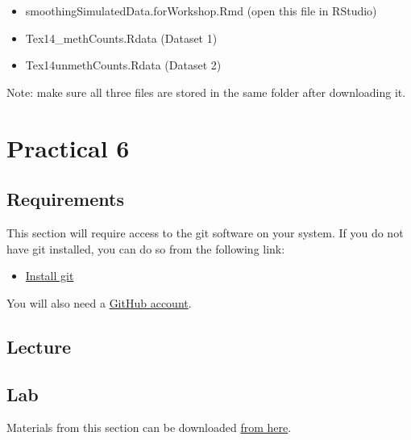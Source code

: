 \documentclass[
]{book}
\providecommand{\tightlist}{%
  \setlength{\itemsep}{0pt}\setlength{\parskip}{0pt}}
\begin{document}
\begin{itemize}
\item
  smoothingSimulatedData.forWorkshop.Rmd (open this file in RStudio)
\item
  Tex14\_methCounts.Rdata (Dataset 1)
\item
  Tex14unmethCounts.Rdata (Dataset 2)
\end{itemize}

Note: make sure all three files are stored in the same folder after downloading it.

\chapter{Practical 6}\label{practical-6}

\section{Requirements}\label{requirements-3}

This section will require access to the git software on your system. If you do not have git installed, you can do so from the following link:

\begin{itemize}
\tightlist
\item
  \href{https://git-scm.com/book/en/v2/Getting-Started-Installing-Git}{Install git}
\end{itemize}

You will also need a \href{http://github.com/}{GitHub account}.

\section{Lecture}\label{lecture-8}

\section{Lab}\label{lab-7}

Materials from this section can be downloaded \href{https://github.com/aosakwe/CBW-INR-Git-With-R}{from here}.


\end{document}

